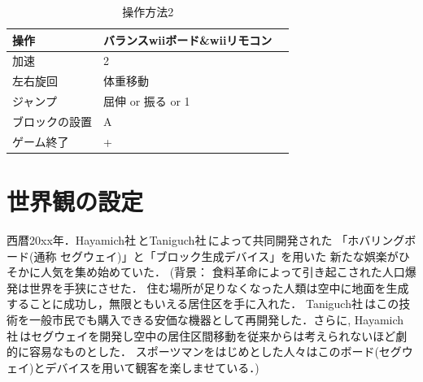 \documentclass{jarticle}
\begin{document}
\begin{table}[H]
    \caption{操作方法2}
    \label{table:control2}
    \begin{center}
    \begin{tabular}{|l|l|l|}\hline
    操作 & バランスwiiボード\&wiiリモコン\\ \hline
    加速 & 2 \\ \hline
    左右旋回 & 体重移動 \\ \hline
    ジャンプ & 屈伸 or 振る or 1 \\ \hline
    ブロックの設置 & A \\ \hline
    ゲーム終了 & + \\\hline
    \end{tabular}
    \end{center}
\end{table}

\section{世界観の設定}
\begin{shadebox}
\label{世界観の設定}
西暦20xx年．Hayamich社\,とTaniguch社\,によって共同開発された
「ホバリングボード(通称 セグウェイ)」と「ブロック生成デバイス」を用いた
新たな娯楽がひそかに人気を集め始めていた．
(背景：
食料革命によって引き起こされた人口爆発は世界を手狭にさせた．
住む場所が足りなくなった人類は空中に地面を生成することに成功し，無限ともいえる居住区を手に入れた．
Taniguch社\,はこの技術を一般市民でも購入できる安価な機器として再開発した．さらに, Hayamich社\,はセグウェイを開発し空中の居住区間移動を従来からは考えられないほど劇的に容易なものとした．
スポーツマンをはじめとした人々はこのボード(セグウェイ)とデバイスを用いて観客を楽しませている．)
\end{shadebox}
\end{document}
